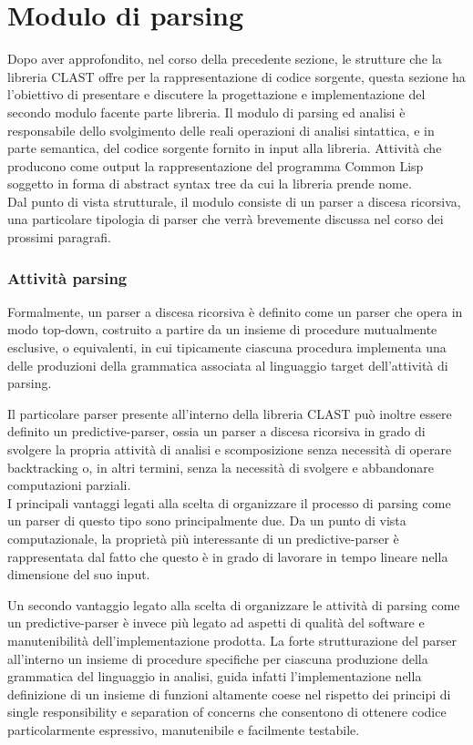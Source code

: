 \section{Modulo di parsing}

Dopo aver approfondito, nel corso della precedente sezione, le strutture che
la libreria CLAST offre per la rappresentazione di codice sorgente, questa
sezione ha l’obiettivo di presentare e discutere la progettazione e
implementazione del secondo modulo facente parte libreria. Il modulo di
parsing ed analisi è responsabile dello svolgimento delle reali operazioni di
analisi sintattica, e in parte semantica, del codice sorgente fornito in input
alla libreria. Attività che producono come output la rappresentazione del
programma Common Lisp soggetto in forma di abstract syntax tree da cui la
libreria prende nome.\\

Dal punto di vista strutturale, il modulo consiste di un parser a discesa
ricorsiva, una particolare tipologia di parser che verrà brevemente discussa
nel corso dei prossimi paragrafi.

\subsubsection{Attività parsing}

Formalmente, un parser a discesa ricorsiva è definito come un parser che opera
in modo top-down, costruito a partire da un insieme di procedure mutualmente
esclusive, o equivalenti, in cui tipicamente ciascuna procedura implementa una
delle produzioni della grammatica associata al linguaggio target dell’attività
di parsing.

Il particolare parser presente all’interno della libreria CLAST può inoltre
essere definito un predictive-parser, ossia un parser a discesa ricorsiva in
grado di svolgere la propria attività di analisi e scomposizione senza
necessità di operare backtracking o, in altri termini, senza la necessità di
svolgere e abbandonare computazioni parziali.\\

I principali vantaggi legati alla scelta di organizzare il processo di parsing
come un parser di questo tipo sono principalmente due. Da un punto di vista
computazionale, la proprietà più interessante di un predictive-parser è
rappresentata dal fatto che questo è in grado di lavorare in tempo lineare
nella dimensione del suo input.

Un secondo vantaggio legato alla scelta di organizzare le attività di parsing
come un predictive-parser è invece più legato ad aspetti di qualità del
software e manutenibilità dell’implementazione prodotta. La forte
strutturazione del parser all'interno un insieme di procedure specifiche per
ciascuna produzione della grammatica del linguaggio in analisi, guida infatti
l’implementazione nella definizione di un insieme di funzioni altamente coese
nel rispetto dei principi di single responsibility e separation of concerns
che consentono di ottenere codice particolarmente espressivo, manutenibile e
facilmente testabile.\\


